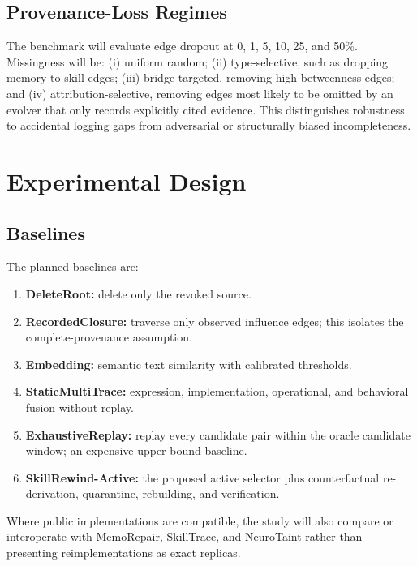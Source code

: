 \documentclass[11pt]{article}
\begin{document}
\subsection{Provenance-Loss Regimes}
The benchmark will evaluate edge dropout at 0, 1, 5, 10, 25, and 50\%. Missingness will be: (i) uniform random; (ii) type-selective, such as dropping memory-to-skill edges; (iii) bridge-targeted, removing high-betweenness edges; and (iv) attribution-selective, removing edges most likely to be omitted by an evolver that only records explicitly cited evidence. This distinguishes robustness to accidental logging gaps from adversarial or structurally biased incompleteness.

\section{Experimental Design}

\subsection{Baselines}
The planned baselines are:
\begin{enumerate}
\item \textbf{DeleteRoot:} delete only the revoked source.
\item \textbf{RecordedClosure:} traverse only observed influence edges; this isolates the complete-provenance assumption.
\item \textbf{Embedding:} semantic text similarity with calibrated thresholds.
\item \textbf{StaticMultiTrace:} expression, implementation, operational, and behavioral fusion without replay.
\item \textbf{ExhaustiveReplay:} replay every candidate pair within the oracle candidate window; an expensive upper-bound baseline.
\item \textbf{SkillRewind-Active:} the proposed active selector plus counterfactual re-derivation, quarantine, rebuilding, and verification.
\end{enumerate}
Where public implementations are compatible, the study will also compare or interoperate with MemoRepair, SkillTrace, and NeuroTaint rather than presenting reimplementations as exact replicas.
\end{document}
